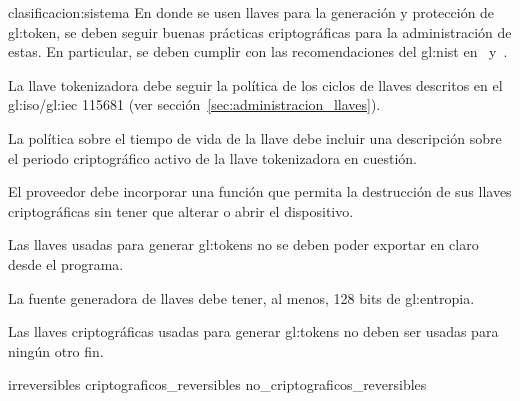 

{clasificacion:sistema}
{
  En donde se usen llaves para la generación y protección de \gls{gl:token},
  se deben seguir buenas prácticas criptográficas para la administración de
  estas. En particular, se deben cumplir con las recomendaciones del
  \gls{gl:nist} en~\cite{nist_llaves} y~\cite{nist_disenio_llaves}.
}

{
  La llave tokenizadora debe seguir la política de los ciclos de llaves
  descritos en el \acrshort{gl:iso}/\acrshort{gl:iec} 115681 (ver
  sección~\ref{sec:administracion_llaves}).
}

{
  La política sobre el tiempo de vida de la llave debe incluir una
  descripción sobre el periodo criptográfico activo de la llave
  tokenizadora en cuestión.
}

{
  El proveedor debe incorporar una función que permita la destrucción
  de sus llaves criptográficas sin tener que alterar o abrir el
  dispositivo.
}

{
  Las llaves usadas para generar \glspl{gl:token} no se deben poder
  exportar en claro desde el programa.
}

{
  La fuente generadora de llaves debe tener, al menos, 128 bits de
  \gls{gl:entropia}.
}

{
  Las llaves criptográficas usadas para generar \glspl{gl:token} no
  deben ser usadas para ningún otro fin.
}

{irreversibles}
{criptograficos_reversibles}
{no_criptograficos_reversibles}



